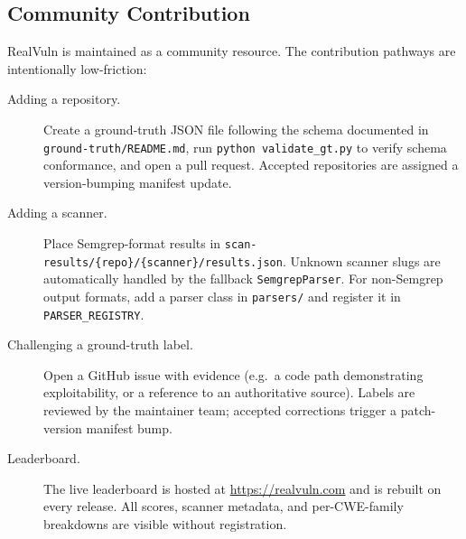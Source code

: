 \subsection{Community Contribution}

RealVuln is maintained as a community resource.  The contribution pathways are
intentionally low-friction:

\begin{description}
  \item[Adding a repository.]
    Create a ground-truth JSON file following the schema documented in
    \texttt{ground-truth/README.md}, run \texttt{python validate\_gt.py} to
    verify schema conformance, and open a pull request.  Accepted repositories
    are assigned a version-bumping manifest update.

  \item[Adding a scanner.]
    Place Semgrep-format results in
    \texttt{scan-results/\{repo\}/\{scanner\}/results.json}.  Unknown scanner
    slugs are automatically handled by the fallback \texttt{SemgrepParser}.
    For non-Semgrep output formats, add a parser class in \texttt{parsers/}
    and register it in \texttt{PARSER\_REGISTRY}.

  \item[Challenging a ground-truth label.]
    Open a GitHub issue with evidence (e.g.\ a code path demonstrating
    exploitability, or a reference to an authoritative source).  Labels are
    reviewed by the maintainer team; accepted corrections trigger a
    patch-version manifest bump.

  \item[Leaderboard.]
    The live leaderboard is hosted at \url{https://realvuln.com} and is rebuilt
    on every release.  All scores, scanner metadata, and per-CWE-family
    breakdowns are visible without registration.
\end{description}
